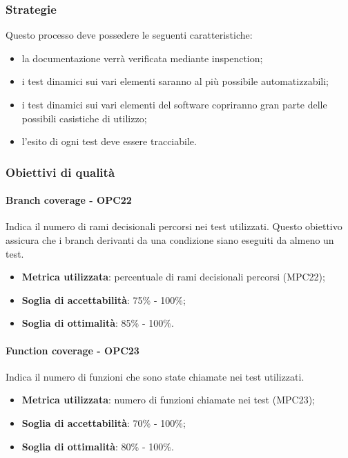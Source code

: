 \documentclass[PdQ.tex]{subfiles}
\begin{document}
		\subsubsection{Strategie}
			Questo processo deve possedere le seguenti caratteristiche:
			\begin{itemize}
				\item la documentazione verrà verificata mediante inspenction;
				\item i test dinamici sui vari elementi saranno al più possibile automatizzabili;
				\item i test dinamici sui vari elementi del software copriranno gran parte delle possibili casistiche di utilizzo;
				\item l'esito di ogni test deve essere tracciabile.
			\end{itemize}

		\subsubsection{Obiettivi di qualità}
			\paragraph{Branch coverage - OPC22}
				Indica il numero di rami decisionali percorsi nei test utilizzati. Questo obiettivo assicura che i branch derivanti da una condizione siano
				eseguiti da almeno un test.
				\begin{itemize}
					\item \textbf{Metrica utilizzata}: percentuale di rami decisionali percorsi (MPC22);
					\item \textbf{Soglia di accettabilità}: 75\% - 100\%;
					\item \textbf{Soglia di ottimalità}: 85\% - 100\%.
				\end{itemize}

			\paragraph{Function coverage - OPC23}
				Indica il numero di funzioni che sono state chiamate nei test utilizzati.
				\begin{itemize}
					\item \textbf{Metrica utilizzata}: numero di funzioni chiamate nei test (MPC23);
					\item \textbf{Soglia di accettabilità}: 70\% - 100\%;
					\item \textbf{Soglia di ottimalità}: 80\% - 100\%.
				\end{itemize}
\end{document}
